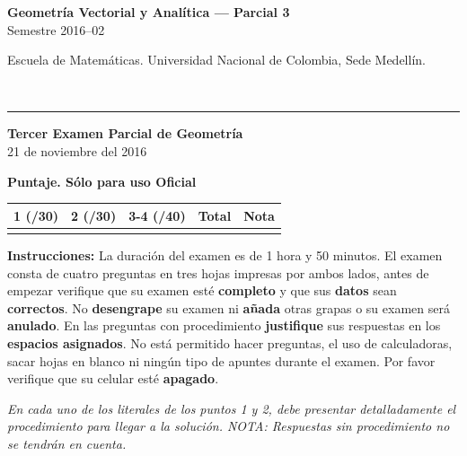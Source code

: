 \documentclass[11pt]{article}
\newcommand{\nota}[1]{{\small\itshape\color{unalblue!70!black} #1}}
\begin{document}
\noindent
\begin{minipage}[t]{0.6\linewidth}
{\small\bfseries Geometría Vectorial y Analítica --- Parcial 3}\\
{\small Semestre 2016--02}
\end{minipage}%
\hfill
\begin{minipage}[t]{0.35\linewidth}
\raggedleft\small Escuela de Matemáticas. Universidad Nacional de Colombia, Sede Medellín.
\end{minipage}\\[2pt]
\rule{\linewidth}{0.6pt}

\begin{center}
\textbf{Tercer Examen Parcial de Geometría}\\
21 de noviembre del 2016
\end{center}

\vspace{6pt}
\textbf{Puntaje. Sólo para uso Oficial}

\begin{center}
\begin{tabular}{|c|c|c|c|c|}
\hline
1 (/30) & 2 (/30) & 3-4 (/40) & Total & Nota \\
\hline
 & & & & \\
\hline
\end{tabular}
\end{center}

\vspace{10pt}
\textbf{Instrucciones:} La duración del examen es de 1 hora y 50 minutos. El examen consta de cuatro preguntas en tres hojas impresas por ambos lados, antes de empezar verifique que su examen esté \textbf{completo} y que sus \textbf{datos} sean \textbf{correctos}. No \textbf{desengrape} su examen ni \textbf{añada} otras grapas o su examen será \textbf{anulado}. En las preguntas con procedimiento \textbf{justifique} sus respuestas en los \textbf{espacios asignados}. No está permitido hacer preguntas, el uso de calculadoras, sacar hojas en blanco ni ningún tipo de apuntes durante el examen. Por favor verifique que su celular esté \textbf{apagado}.

\vspace{6pt}
\nota{En cada uno de los literales de los puntos 1 y 2, debe presentar detalladamente el procedimiento para llegar a la solución. NOTA: Respuestas sin procedimiento no se tendrán en cuenta.}
\end{document}
